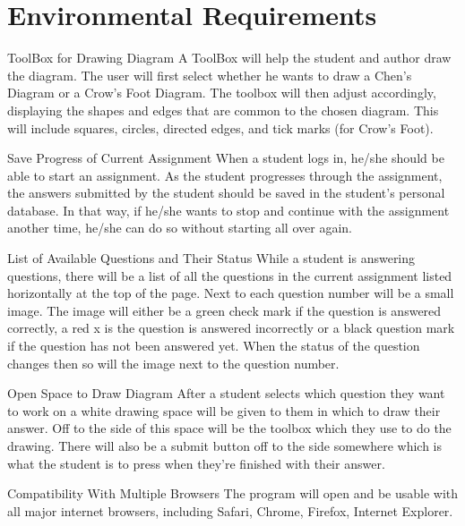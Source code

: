 \chapter{Environmental Requirements}


    \begin{section}{ToolBox for Drawing Diagram}
    A ToolBox will help the student and author draw the diagram. The user will first select whether he wants to draw a Chen's Diagram or a Crow's Foot Diagram. The toolbox will then adjust accordingly, displaying the shapes and edges that are common to the chosen diagram. This will include squares, circles, directed edges, and tick marks (for Crow's Foot).
    \end{section}
    
    \begin{section}{Save Progress of Current Assignment}
    When a student logs in, he/she should be able to start an assignment. As the student progresses through the assignment, the answers submitted by the student should be saved in the student's personal database. In that way, if he/she wants to stop and continue with the assignment another time, he/she can do so without starting all over again.
    \end{section}
    
    \begin{section}{List of Available Questions and Their Status}
    While a student is answering questions, there will be a list of all the questions in the current assignment listed horizontally at the top of the page.  Next to each question number will be a small image.  The image will either be a green check mark if the question is answered correctly, a red x is the question is answered incorrectly or a black question mark if the question has not been answered yet.  When the status of the question changes then so will the image next to the question number.
    \end{section}
    
    \begin{section}{Open Space to Draw Diagram}
    After a student selects which question they want to work on a white drawing space will be given to them in which to draw their answer. Off to the side of this space will be the toolbox which they use to do the drawing. There will also be a submit button off to the side somewhere which is what the student is to press when they're finished with their answer.
    \end{section}
    
    \begin{section}{Compatibility With Multiple Browsers}
    The program will open and be usable with all major internet browsers, including Safari, Chrome, Firefox, Internet Explorer.
    \end{section}





